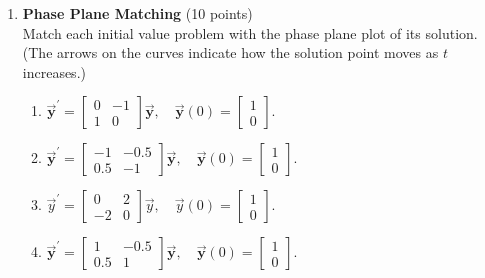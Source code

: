 \newpage
\begin{enumerate}

  \item \textbf{Phase Plane Matching} (10 points)\\
  Match each initial value problem with the phase plane plot of its solution. (The arrows on the curves indicate how the solution point moves as $t$ increases.)
  \begin{enumerate}[label=\arabic*.]
    \item $\overrightarrow{\boldsymbol{y}}^{\prime}=\left[\begin{array}{rr}0 & -1 \\ 1 & 0\end{array}\right] \overrightarrow{\boldsymbol{y}},\quad \overrightarrow{\boldsymbol{y}}(0)=\left[\begin{array}{l}1 \\ 0\end{array}\right]$.\\
    \begin{subanswer}
    \end{subanswer}
    \item $\overrightarrow{\boldsymbol{y}}^{\prime}=\left[\begin{array}{rr}-1 & -0.5 \\ 0.5 & -1\end{array}\right] \overrightarrow{\boldsymbol{y}},\quad \overrightarrow{\boldsymbol{y}}(0)=\left[\begin{array}{l}1 \\ 0\end{array}\right]$.\\
    \begin{subanswer}
    \end{subanswer}
    \item $\vec{y}^{\prime}=\left[\begin{array}{rr}0 & 2 \\ -2 & 0\end{array}\right] \vec{y},\quad \vec{y}(0)=\left[\begin{array}{l}1 \\ 0\end{array}\right]$.\\
    \begin{subanswer}
    \end{subanswer}
    \item $\overrightarrow{\boldsymbol{y}}^{\prime}=\left[\begin{array}{rr}1 & -0.5 \\ 0.5 & 1\end{array}\right] \overrightarrow{\boldsymbol{y}},\quad \overrightarrow{\boldsymbol{y}}(0)=\left[\begin{array}{l}1 \\ 0\end{array}\right]$.\\
    \begin{subanswer}
    \end{subanswer}
  \end{enumerate}



\end{enumerate}
